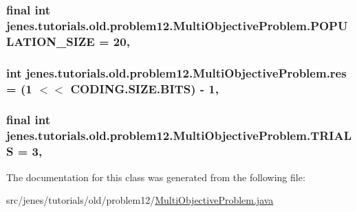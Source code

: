 \hypertarget{classjenes_1_1tutorials_1_1old_1_1problem12_1_1_multi_objective_problem_a99a8a3d61d1075675f78916b3854d812}{
\subsubsection[{P\-O\-P\-U\-L\-A\-T\-I\-O\-N\-\_\-\-S\-I\-Z\-E}]{\setlength{\rightskip}{0pt plus 5cm}final int jenes.\-tutorials.\-old.\-problem12.\-Multi\-Objective\-Problem.\-P\-O\-P\-U\-L\-A\-T\-I\-O\-N\-\_\-\-S\-I\-Z\-E = 20\hspace{0.3cm}{\ttfamily [static]}, {\ttfamily [private]}}}\label{classjenes_1_1tutorials_1_1old_1_1problem12_1_1_multi_objective_problem_a99a8a3d61d1075675f78916b3854d812}
\hypertarget{classjenes_1_1tutorials_1_1old_1_1problem12_1_1_multi_objective_problem_a07c4d7ac56183ed3ae3d023e7e624b75}{
\subsubsection[{res}]{\setlength{\rightskip}{0pt plus 5cm}int jenes.\-tutorials.\-old.\-problem12.\-Multi\-Objective\-Problem.\-res = (1 $<$$<$ C\-O\-D\-I\-N\-G.\-S\-I\-Z\-E.\-B\-I\-T\-S) -\/ 1\hspace{0.3cm}{\ttfamily [static]}, {\ttfamily [private]}}}\label{classjenes_1_1tutorials_1_1old_1_1problem12_1_1_multi_objective_problem_a07c4d7ac56183ed3ae3d023e7e624b75}
\hypertarget{classjenes_1_1tutorials_1_1old_1_1problem12_1_1_multi_objective_problem_a8d808c0e870ab23a05cd858695d256c9}{
\subsubsection[{T\-R\-I\-A\-L\-S}]{\setlength{\rightskip}{0pt plus 5cm}final int jenes.\-tutorials.\-old.\-problem12.\-Multi\-Objective\-Problem.\-T\-R\-I\-A\-L\-S = 3\hspace{0.3cm}{\ttfamily [static]}, {\ttfamily [private]}}}\label{classjenes_1_1tutorials_1_1old_1_1problem12_1_1_multi_objective_problem_a8d808c0e870ab23a05cd858695d256c9}


The documentation for this class was generated from the following file\-:\begin{DoxyCompactItemize}
\item 
src/jenes/tutorials/old/problem12/\hyperlink{old_2problem12_2_multi_objective_problem_8java}{Multi\-Objective\-Problem.\-java}\end{DoxyCompactItemize}
